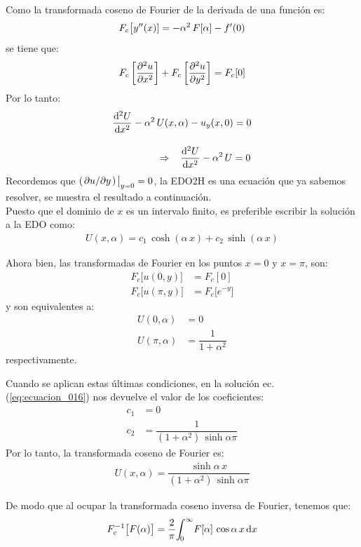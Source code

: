 Como la transformada coseno de Fourier de la derivada de una función es:
\begin{align*}
F_{c} \big[{y}^{\prime \prime}(x)] = - \alpha^{2} \, F[\alpha] - {f}^{\prime} (0)
\end{align*}
se tiene que:
\begin{align*}
F_{c} \left[\pdv[2]{u}{x} \right] + F_{c} \left[\pdv[2]{u}{y} \right] = F_{c} [0]
\end{align*}
Por lo tanto:
\begin{align*}
\dv[2]{U}{x} - \alpha^{2} \, &U(x, \alpha) - u_{y} (x, 0) = 0 \\[1em]
&\Rightarrow \hspace{0.3cm} \dv[2]{U}{x} - \alpha^{2} \, U = 0
\end{align*}
Recordemos que $(\pdv*{u}{y})\eval_{y=0} = 0$, la EDO2H es una ecuación que ya sabemos resolver, se muestra el resultado a continuación.
\\[0.5em]
Puesto que el dominio de $x$ es un intervalo finito, es preferible escribir la solución a la EDO como:
\begin{align}
U(x, \alpha) = c_{1} \, \cosh (\alpha \, x) + c_{2} \, \sinh (\alpha \, x)
\label{eq:ecuacion_016}
\end{align}

Ahora bien, las transformadas de Fourier en los puntos $x = 0$ y $x = \pi$, son:
\begin{align*}
F_{c} \big[ u(0, y)\big] &= F_{c} [0] \\[0.5em]
F_{c} \big[ u(\pi, y)\big] &= F_{c} \big[ e^{-y} \big]
\end{align*}
y son equivalentes a:
\begin{align*}
U(0, \alpha) &= 0 \\[0.5em]
U(\pi, \alpha) &= \dfrac{1}{1 +  \alpha^{2}}
\end{align*}
respectivamente.

Cuando se aplican estas últimas condiciones, en la solución ec. (\ref{eq:ecuacion_016}) nos devuelve el valor de los coeficientes:
\begin{align*}
c_{1} &= 0 \\[0.5em]
c_{2} &= \dfrac{1}{(1 + \alpha^{2}) \, \sinh \alpha \pi}
\end{align*}
Por lo tanto, la transformada coseno de Fourier es:
\begin{align*}
U(x, \alpha) = \dfrac{\sinh \alpha \, x}{(1 + \alpha^{2}) \, \sinh \alpha \pi}
\end{align*}

De modo que al ocupar la transformada coseno inversa de Fourier, tenemos que:
\begin{align*}
F_{c}^{-1} \big[F(\alpha)\big] = \dfrac{2}{\pi} \scaleint{5ex}_{\bs 0}^{\infty} F[\alpha] \, \cos \alpha \, x \dd{x}
\end{align*}

